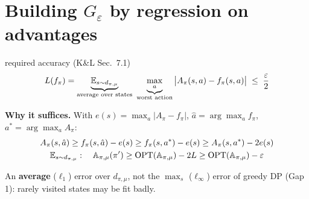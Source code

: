 \section{Building $G_\varepsilon$ by regression on advantages}
\label{app:greedy}

\begin{center}
\end{center}

\begin{defbox}{required accuracy (K\&L Sec.~7.1)}
\begin{gather*}
  L(f_\pi) = \underbrace{\mathbb{E}_{s\sim d_{\pi,\mu}}}_{\text{average over states}}\ \underbrace{\max_a}_{\text{worst action}}\big|A_\pi(s,a)-f_\pi(s,a)\big| \;\le\; \frac{\varepsilon}{2}
\end{gather*}
\end{defbox}

\textbf{Why it suffices.} With $e(s)=\max_a|A_\pi-f_\pi|$, $\hat a=\arg\max_af_\pi$, $a^*=\arg\max_aA_\pi$:
\begin{gather*}
  A_\pi(s,\hat a) \ge f_\pi(s,\hat a)-e(s) \ge f_\pi(s,a^*)-e(s) \ge A_\pi(s,a^*)-2e(s) \\
  \mathbb{E}_{s\sim d_{\pi,\mu}}:\quad \mathbb{A}_{\pi,\mu}(\pi') \ge \mathrm{OPT}(\mathbb{A}_{\pi,\mu}) - 2L \ge \mathrm{OPT}(\mathbb{A}_{\pi,\mu}) - \varepsilon
\end{gather*}

\begin{keybox}
An \textbf{average} ($\ell_1$) error over $d_{\pi,\mu}$, not the $\max_s$ ($\ell_\infty$) error of greedy DP (Gap 1): rarely visited states may be fit badly.
\end{keybox}

